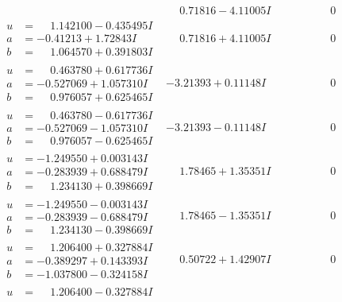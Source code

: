 \documentclass[1p]{elsarticle_modified}
\theoremstyle{definition}
\begin{document}
$$\begin{array}{c|c|c}
 & \phantom{-}0.71816 - 4.11005 I & \phantom{-0.000000 } 0 \\ \hline\begin{aligned}
u &= \phantom{-}1.142100 - 0.435495 I \\
a &= -0.41213 + 1.72843 I \\
b &= \phantom{-}1.064570 + 0.391803 I\end{aligned}
 & \phantom{-}0.71816 + 4.11005 I & \phantom{-0.000000 } 0 \\ \hline\begin{aligned}
u &= \phantom{-}0.463780 + 0.617736 I \\
a &= -0.527069 + 1.057310 I \\
b &= \phantom{-}0.976057 + 0.625465 I\end{aligned}
 & -3.21393 + 0.11148 I & \phantom{-0.000000 } 0 \\ \hline\begin{aligned}
u &= \phantom{-}0.463780 - 0.617736 I \\
a &= -0.527069 - 1.057310 I \\
b &= \phantom{-}0.976057 - 0.625465 I\end{aligned}
 & -3.21393 - 0.11148 I & \phantom{-0.000000 } 0 \\ \hline\begin{aligned}
u &= -1.249550 + 0.003143 I \\
a &= -0.283939 + 0.688479 I \\
b &= \phantom{-}1.234130 + 0.398669 I\end{aligned}
 & \phantom{-}1.78465 + 1.35351 I & \phantom{-0.000000 } 0 \\ \hline\begin{aligned}
u &= -1.249550 - 0.003143 I \\
a &= -0.283939 - 0.688479 I \\
b &= \phantom{-}1.234130 - 0.398669 I\end{aligned}
 & \phantom{-}1.78465 - 1.35351 I & \phantom{-0.000000 } 0 \\ \hline\begin{aligned}
u &= \phantom{-}1.206400 + 0.327884 I \\
a &= -0.389297 + 0.143393 I \\
b &= -1.037800 - 0.324158 I\end{aligned}
 & \phantom{-}0.50722 + 1.42907 I & \phantom{-0.000000 } 0 \\ \hline\begin{aligned}
u &= \phantom{-}1.206400 - 0.327884 I \\

\end{aligned}
\end{array}$$
\end{document}

